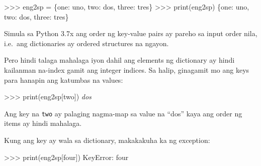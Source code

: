 \documentclass[10pt,]{book}
\newenvironment{Shaded}{}{}
\newcommand{\BuiltInTok}[1]{\textcolor[rgb]{0.00,0.50,0.00}{#1}}
\newcommand{\CommentTok}[1]{\textcolor[rgb]{0.38,0.63,0.69}{\textit{#1}}}
\newcommand{\NormalTok}[1]{#1}
\newcommand{\OperatorTok}[1]{\textcolor[rgb]{0.40,0.40,0.40}{#1}}
\newcommand{\PreprocessorTok}[1]{\textcolor[rgb]{0.74,0.48,0.00}{#1}}
\newcommand{\StringTok}[1]{\textcolor[rgb]{0.25,0.44,0.63}{#1}}
\begin{document}
\begin{Shaded}
\begin{Highlighting}[]
\OperatorTok{\textgreater{}\textgreater{}\textgreater{}}\NormalTok{ eng2sp }\OperatorTok{=}\NormalTok{ \{}\StringTok{\textquotesingle{}one\textquotesingle{}}\NormalTok{: }\StringTok{\textquotesingle{}uno\textquotesingle{}}\NormalTok{, }\StringTok{\textquotesingle{}two\textquotesingle{}}\NormalTok{: }\StringTok{\textquotesingle{}dos\textquotesingle{}}\NormalTok{, }\StringTok{\textquotesingle{}three\textquotesingle{}}\NormalTok{: }\StringTok{\textquotesingle{}tres\textquotesingle{}}\NormalTok{\}}
\OperatorTok{\textgreater{}\textgreater{}\textgreater{}} \BuiltInTok{print}\NormalTok{(eng2sp)}
\NormalTok{\{}\StringTok{\textquotesingle{}one\textquotesingle{}}\NormalTok{: }\StringTok{\textquotesingle{}uno\textquotesingle{}}\NormalTok{, }\StringTok{\textquotesingle{}two\textquotesingle{}}\NormalTok{: }\StringTok{\textquotesingle{}dos\textquotesingle{}}\NormalTok{, }\StringTok{\textquotesingle{}three\textquotesingle{}}\NormalTok{: }\StringTok{\textquotesingle{}tres\textquotesingle{}}\NormalTok{\}}
\end{Highlighting}
\end{Shaded}

Simula sa Python 3.7x ang order ng key-value pairs ay pareho sa input
order nila, i.e.~ang dictionaries ay ordered structures na ngayon.

Pero hindi talaga mahalaga iyon dahil ang elements ng dictionary ay
hindi kailanman na-index gamit ang integer indices. Sa halip, ginagamit
mo ang keys para hanapin ang katumbas na values:

\begin{Shaded}
\begin{Highlighting}[]
\OperatorTok{\textgreater{}\textgreater{}\textgreater{}} \BuiltInTok{print}\NormalTok{(eng2sp[}\StringTok{\textquotesingle{}two\textquotesingle{}}\NormalTok{])}
\CommentTok{\textquotesingle{}dos\textquotesingle{}}
\end{Highlighting}
\end{Shaded}

Ang key na \texttt{\textquotesingle{}two\textquotesingle{}} ay palaging
nagma-map sa value na ``dos'' kaya ang order ng items ay hindi mahalaga.

Kung ang key ay wala sa dictionary, makakakuha ka ng exception:

 

\begin{Shaded}
\begin{Highlighting}[]
\OperatorTok{\textgreater{}\textgreater{}\textgreater{}} \BuiltInTok{print}\NormalTok{(eng2sp[}\StringTok{\textquotesingle{}four\textquotesingle{}}\NormalTok{])}
\PreprocessorTok{KeyError}\NormalTok{: }\StringTok{\textquotesingle{}four\textquotesingle{}}
\end{Highlighting}
\end{Shaded}
\end{document}
